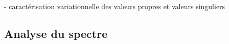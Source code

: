 - caractérisation variationnelle des valeurs propres et valeurs singuliers

\subsection{Analyse du spectre}


%
%
%


